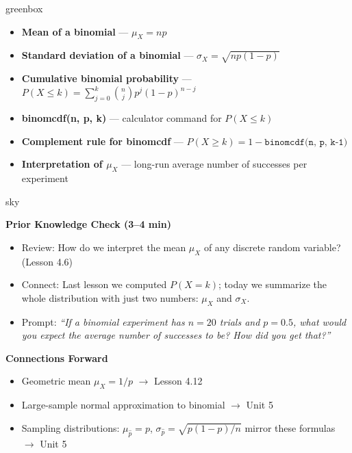 \documentclass[10pt]{article}
\begin{document}
\begin{skillbox}{greenbox}
\begin{minipage}[t]{0.48\linewidth}
    \begin{itemize}
        \item \textbf{Mean of a binomial} --- $\mu_X = np$
        \item \textbf{Standard deviation of a binomial} ---
              $\sigma_X = \sqrt{np(1-p)}$
        \item \textbf{Cumulative binomial probability} ---
              $P(X \le k) = \sum_{j=0}^{k} \binom{n}{j}p^j(1-p)^{n-j}$
    \end{itemize}
\end{minipage}
\hfill
\begin{minipage}[t]{0.48\linewidth}
    \begin{itemize}
        \item \textbf{binomcdf(n, p, k)} --- calculator command for $P(X \le k)$
        \item \textbf{Complement rule for binomcdf} ---
              $P(X \ge k) = 1 - \texttt{binomcdf(n, p, k-1)}$
        \item \textbf{Interpretation of $\mu_X$} --- long-run average number of
              successes per experiment
    \end{itemize}
\end{minipage}
\end{skillbox}

\begin{skillbox}{sky}
\begin{minipage}[t]{0.48\linewidth}
    \textbf{Prior Knowledge Check (3--4 min)}
    \begin{itemize}
        \item Review: How do we interpret the mean $\mu_X$ of any discrete random
              variable? (Lesson 4.6)
        \item Connect: Last lesson we computed $P(X = k)$; today we summarize the
              whole distribution with just two numbers: $\mu_X$ and $\sigma_X$.
        \item Prompt: \textit{``If a binomial experiment has $n = 20$ trials and
              $p = 0.5$, what would you expect the average number of successes
              to be? How did you get that?''}
    \end{itemize}
\end{minipage}
\hfill
\begin{minipage}[t]{0.48\linewidth}
    \textbf{Connections Forward}
    \begin{itemize}
        \item Geometric mean $\mu_X = 1/p$ $\to$ Lesson 4.12
        \item Large-sample normal approximation to binomial $\to$ Unit 5
        \item Sampling distributions: $\mu_{\hat{p}} = p$,
              $\sigma_{\hat{p}} = \sqrt{p(1-p)/n}$ mirror these formulas $\to$
              Unit 5
    \end{itemize}
\end{minipage}
\end{skillbox}
\end{document}
